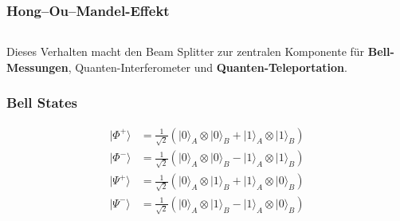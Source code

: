 \begin{frame}
	\frametitle{Hong–Ou–Mandel-Effekt}
	\begin{columns}
		\begin{column}{0.33\linewidth}
		\end{column}
		\begin{column}{0.66\linewidth}
		\end{column}
	\end{columns}
	Dieses Verhalten macht den Beam Splitter zur zentralen Komponente für \textbf{Bell-Messungen}, Quanten-Interferometer und \textbf{Quanten-Teleportation}.
\end{frame}

\begin{frame}
	\frametitle{Bell States}
	\begin{align*}
		\lvert \Phi^+ \rangle &= \frac{1}{\sqrt{2}} \left( \lvert 0 \rangle_A \otimes \lvert 0 \rangle_B + \lvert 1 \rangle_A \otimes \lvert 1 \rangle_B \right) \\
		\lvert \Phi^- \rangle &= \frac{1}{\sqrt{2}} \left( \lvert 0 \rangle_A \otimes \lvert 0 \rangle_B - \lvert 1 \rangle_A \otimes \lvert 1 \rangle_B \right) \\
		\lvert \Psi^+ \rangle &= \frac{1}{\sqrt{2}} \left( \lvert 0 \rangle_A \otimes \lvert 1 \rangle_B + \lvert 1 \rangle_A \otimes \lvert 0 \rangle_B \right) \\
		\lvert \Psi^- \rangle &= \frac{1}{\sqrt{2}} \left( \lvert 0 \rangle_A \otimes \lvert 1 \rangle_B - \lvert 1 \rangle_A \otimes \lvert 0 \rangle_B \right)
	\end{align*}
\end{frame}

\begin{frame}
\end{frame}

